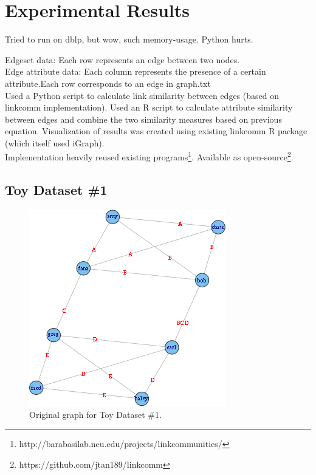 \documentclass{report} %
\begin{document}
\section*{Experimental Results}

Tried to run on dblp, but wow, such memory-usage. Python hurts.

Edgeset data: Each row represents an edge between two nodes.\\
Edge attribute data: Each column represents the presence of a certain attribute.Each row corresponds to an edge in graph.txt\\

Used a Python script to calculate link similarity between edges (based on linkcomm implementation).
Used an R script to calculate attribute similarity between edges and combine the two similarity measures based on previous equation.
Visualization of results was created using existing linkcomm R package (which itself used iGraph).\\

Implementation heavily reused existing programs\footnote{http://barabasilab.neu.edu/projects/linkcommunities/}. Available as open-source\footnote{https://github.com/jtan189/linkcomm}.

\subsection*{Toy Dataset \#1}

\begin{figure}[htp!]
  \centering
  \includegraphics[width=0.55\linewidth]{toy2/orig.png}
  \caption{Original graph for Toy Dataset \#1.}
\end{figure}
\end{document}
